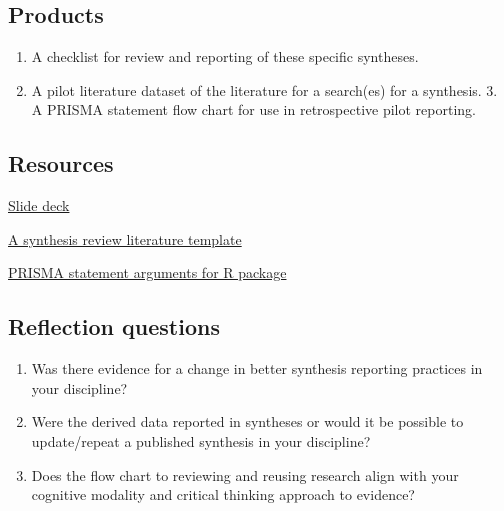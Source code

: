 \documentclass[
]{book}
\providecommand{\tightlist}{%
  \setlength{\itemsep}{0pt}\setlength{\parskip}{0pt}}
\begin{document}
\hypertarget{products-1}{%
\subsection*{Products}\label{products-1}}

\begin{enumerate}
\def\labelenumi{\arabic{enumi}.}
\tightlist
\item
  A checklist for review and reporting of these specific syntheses.\\
\item
  A pilot literature dataset of the literature for a search(es) for a synthesis. 3. A PRISMA statement flow chart for use in retrospective pilot reporting.
\end{enumerate}

\hypertarget{resources-1}{%
\subsection*{Resources}\label{resources-1}}

\href{https://figshare.com/articles/presentation/Quantitative_synthesis_reporting/16608700}{Slide deck}

\href{https://figshare.com/articles/dataset/A_synthesis_review_literature_template/16608715}{A synthesis review literature template}

\href{https://figshare.com/articles/dataset/PRISMA_statement_arguments_for_R_package/16608721}{PRISMA statement arguments for R package}

\hypertarget{reflection-questions-1}{%
\subsection*{Reflection questions}\label{reflection-questions-1}}

\begin{enumerate}
\def\labelenumi{\arabic{enumi}.}
\tightlist
\item
  Was there evidence for a change in better synthesis reporting practices in your discipline?\\
\item
  Were the derived data reported in syntheses or would it be possible to update/repeat a published synthesis in your discipline?\\
\item
  Does the flow chart to reviewing and reusing research align with your cognitive modality and critical thinking approach to evidence?
\end{enumerate}
\end{document}
